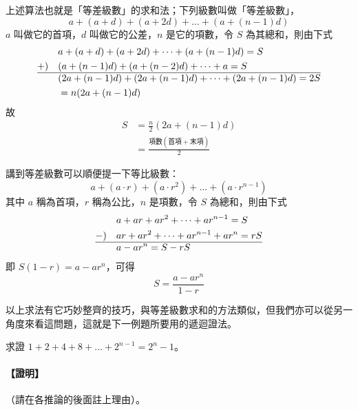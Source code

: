 上述算法也就是「等差級數」的求和法；下列級數叫做「等差級數」，
\begin{equation*}
  a+(a+d)+(a+2d)+\dots+(a+(n-1)d)
\end{equation*}
$a$ 叫做它的首項，$d$ 叫做它的公差，$n$ 是它的項數，令 $S$ 為其總和，則由下式
\begin{align*}
  & a + (a+d) + (a+2d) + \dots + (a+(n-1)d) = S \\
  +) \quad & (a+(n-1)d) + (a+(n-2)d) + \dots + a = S \\
  \hline
  & (2a+(n-1)d) + (2a+(n-1)d) + \dots + (2a+(n-1)d) = 2S \\
  &= n(2a+(n-1)d)
\end{align*}
故
\begin{align*}
  S &= \frac{n}{2}(2a+(n-1)d) \\
  &= \frac{\text{項數}(\text{首項}+\text{末項})}{2}
\end{align*}

講到等差級數可以順便提一下等比級數：
\begin{equation*}
  a+(a \cdot r)+(a \cdot r^2)+\dots+(a \cdot r^{n-1})
\end{equation*}
其中 $a$ 稱為首項，$r$ 稱為公比，$n$ 是項數，令 $S$ 為總和，則由下式
\begin{align*}
  & a + ar + ar^2 + \dots + ar^{n-1} = S \\
  -) \quad & ar + ar^2 + \dots + ar^{n-1} + ar^n = rS \\
  \hline
  & a - ar^n = S - rS
\end{align*}
即 $S(1-r) = a - ar^n$，可得
\begin{equation*}
  S = \frac{a - ar^n}{1-r}
\end{equation*}

以上求法有它巧妙整齊的技巧，與等差級數求和的方法類似，但我們亦可以從另一角度來看這問題，這就是下一例題所要用的遞迴證法。

\medskip
\begin{example}\label{ex:b1-3-5}\label{ex:powers_of_two_sum}
求證 $1+2+4+8+\dots+2^{n-1} = 2^n - 1$。
\end{example}

\paragraph{【證明】}（請在各推論的後面註上理由）。


